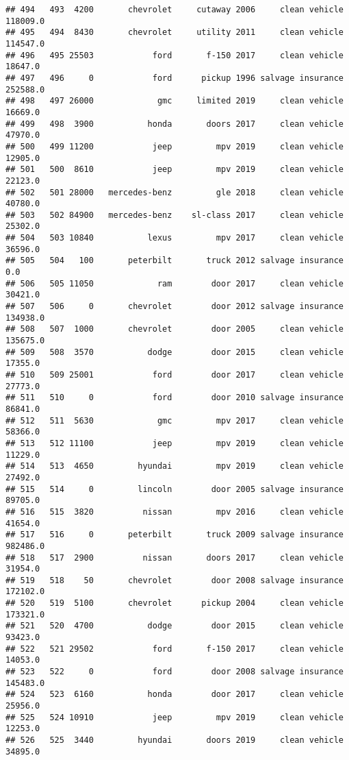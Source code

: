 \documentclass[
]{article}
\begin{document}
\begin{verbatim}
## 494   493  4200       chevrolet     cutaway 2006     clean vehicle  118009.0
## 495   494  8430       chevrolet     utility 2011     clean vehicle  114547.0
## 496   495 25503            ford       f-150 2017     clean vehicle   18647.0
## 497   496     0            ford      pickup 1996 salvage insurance  252588.0
## 498   497 26000             gmc     limited 2019     clean vehicle   16669.0
## 499   498  3900           honda       doors 2017     clean vehicle   47970.0
## 500   499 11200            jeep         mpv 2019     clean vehicle   12905.0
## 501   500  8610            jeep         mpv 2019     clean vehicle   22123.0
## 502   501 28000   mercedes-benz         gle 2018     clean vehicle   40780.0
## 503   502 84900   mercedes-benz    sl-class 2017     clean vehicle   25302.0
## 504   503 10840           lexus         mpv 2017     clean vehicle   36596.0
## 505   504   100       peterbilt       truck 2012 salvage insurance       0.0
## 506   505 11050             ram        door 2017     clean vehicle   30421.0
## 507   506     0       chevrolet        door 2012 salvage insurance  134938.0
## 508   507  1000       chevrolet        door 2005     clean vehicle  135675.0
## 509   508  3570           dodge        door 2015     clean vehicle   17355.0
## 510   509 25001            ford        door 2017     clean vehicle   27773.0
## 511   510     0            ford        door 2010 salvage insurance   86841.0
## 512   511  5630             gmc         mpv 2017     clean vehicle   58366.0
## 513   512 11100            jeep         mpv 2019     clean vehicle   11229.0
## 514   513  4650         hyundai         mpv 2019     clean vehicle   27492.0
## 515   514     0         lincoln        door 2005 salvage insurance   89705.0
## 516   515  3820          nissan         mpv 2016     clean vehicle   41654.0
## 517   516     0       peterbilt       truck 2009 salvage insurance  982486.0
## 518   517  2900          nissan       doors 2017     clean vehicle   31954.0
## 519   518    50       chevrolet        door 2008 salvage insurance  172102.0
## 520   519  5100       chevrolet      pickup 2004     clean vehicle  173321.0
## 521   520  4700           dodge        door 2015     clean vehicle   93423.0
## 522   521 29502            ford       f-150 2017     clean vehicle   14053.0
## 523   522     0            ford        door 2008 salvage insurance  145483.0
## 524   523  6160           honda        door 2017     clean vehicle   25956.0
## 525   524 10910            jeep         mpv 2019     clean vehicle   12253.0
## 526   525  3440         hyundai       doors 2019     clean vehicle   34895.0

\end{verbatim}
\end{document}
